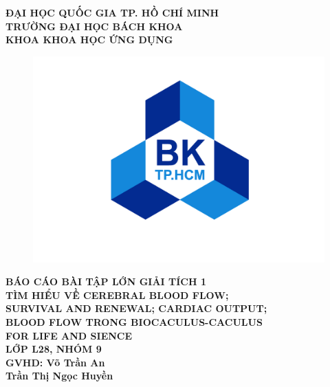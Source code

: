 \documentclass[12pt,a4paper]{article}
\begin{document}
\newpage
{}
\begin{center}
	\begin{large}
		\textbf{ĐẠI HỌC QUỐC GIA TP. HỒ CHÍ MINH\\
			TRƯỜNG ĐẠI HỌC BÁCH KHOA\\
			KHOA KHOA HỌC ỨNG DỤNG}
	\end{large}
	\begin{figure}[H]
		\centering
		\includegraphics[width=0.6\linewidth]{Images/01_logobachkhoa.png}
	\end{figure}
	\Large\textbf{}
	\begin{large}
		\textbf{BÁO CÁO BÀI TẬP LỚN GIẢI TÍCH 1}\\
		\vspace{2.5cm}
		\textbf{
			TÌM HIỂU VỀ CEREBRAL BLOOD FLOW;\\
			SURVIVAL AND RENEWAL; CARDIAC OUTPUT;\\
			BLOOD FLOW TRONG BIOCACULUS-CACULUS\\
			FOR LIFE AND SIENCE
		}\\
		\vspace{1.2cm}
		\textbf{LỚP L28, NHÓM 9}\\
		\vspace{1.2cm}
		\hspace{0.25\linewidth}
		\textbf{GVHD: Võ Trần An}\\
		\hspace{0.25\linewidth}
		\hspace{4.8cm}\textbf{Trần Thị Ngọc Huyền}
	\end{large}
\end{center}
\end{document}
